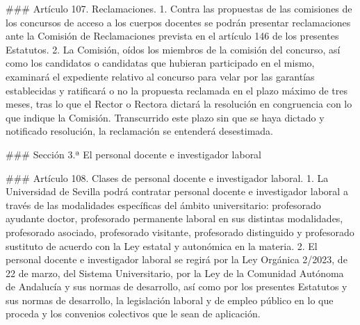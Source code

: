 \documentclass{article}
\begin{document}
\begin{itemize}
\begin{itemize}
\begin{scriptsize}
                  \#\#\# Artículo 107. Reclamaciones.
                  1. Contra las propuestas de las comisiones de los concursos de acceso a los cuerpos docentes se podrán presentar reclamaciones ante la Comisión de Reclamaciones prevista en el artículo 146 de los presentes Estatutos.
                  2. La Comisión, oídos los miembros de la comisión del concurso, así como los candidatos o candidatas que hubieran participado en el mismo, examinará el expediente relativo al concurso para velar por las garantías establecidas y ratificará o no la propuesta reclamada en el plazo máximo de tres meses, tras lo que el Rector o Rectora dictará la resolución en congruencia con lo que indique la Comisión. Transcurrido este plazo sin que se haya dictado y notificado resolución, la reclamación se entenderá desestimada.

                  \#\#\# Sección 3.ª El personal docente e investigador laboral

                  \#\#\# Artículo 108. Clases de personal docente e investigador laboral.
                  1. La Universidad de Sevilla podrá contratar personal docente e investigador laboral a través de las modalidades específicas del ámbito universitario: profesorado ayudante doctor, profesorado permanente laboral en sus distintas modalidades, profesorado asociado, profesorado visitante, profesorado distinguido y profesorado sustituto de acuerdo con la Ley estatal y autonómica en la materia.
                  2. El personal docente e investigador laboral se regirá por la Ley Orgánica 2/2023, de 22 de marzo, del Sistema Universitario, por la Ley de la Comunidad Autónoma de Andalucía y sus normas de desarrollo, así como por los presentes Estatutos y sus normas de desarrollo, la legislación laboral y de empleo público en lo que proceda y los convenios colectivos que le sean de aplicación.


\end{scriptsize}
\end{itemize}
\end{itemize}
\end{document}
